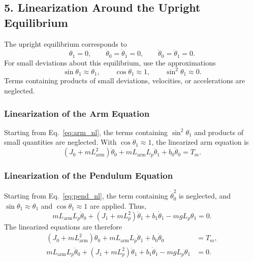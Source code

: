 \documentclass[a4paper,11pt]{article}
\newcommand{\La}{L_{\mathrm{arm}}}
\begin{document}
\subsection{5. Linearization Around the Upright Equilibrium}
The upright equilibrium corresponds to
\begin{equation}
  \theta_1 = 0, \qquad \dot\theta_0 = \dot\theta_1 = 0, \qquad \ddot\theta_0 = \ddot\theta_1 = 0 .
\end{equation}
For small deviations about this equilibrium, use the approximations
\begin{equation}
  \sin\theta_1 \approx \theta_1, \qquad \cos\theta_1 \approx 1, \qquad \sin^2\theta_1 \approx 0 .
\end{equation}
Terms containing products of small deviations, velocities, or accelerations are neglected.

\subsubsection{Linearization of the Arm Equation}
Starting from Eq.~\eqref{eq:arm_nl}, the terms containing $\sin^2\theta_1$ and products of small quantities are neglected. With $\cos\theta_1 \approx 1$, the linearized arm equation is
\begin{equation}
  \left(J_0 + m \La^2\right)\ddot\theta_0 + m \La L_p \ddot\theta_1 + b_0 \dot\theta_0 = T_m .
\end{equation}

\subsubsection{Linearization of the Pendulum Equation}
Starting from Eq.~\eqref{eq:pend_nl}, the term containing $\dot\theta_0^2$ is neglected, and $\sin\theta_1 \approx \theta_1$ and $\cos\theta_1 \approx 1$ are applied. Thus,
\begin{equation}
  m \La L_p \ddot\theta_0 + \left(J_1 + m L_p^2\right)\ddot\theta_1 + b_1 \dot\theta_1 - m g L_p \theta_1 = 0 .
\end{equation}
The linearized equations are therefore
\begin{equation}
\begin{aligned}
  \left(J_0 + m \La^2\right)\ddot\theta_0 + m \La L_p \ddot\theta_1 + b_0 \dot\theta_0 &= T_m ,\\
  m \La L_p \ddot\theta_0 + \left(J_1 + m L_p^2\right)\ddot\theta_1 + b_1 \dot\theta_1 - m g L_p \theta_1 &= 0 .
\end{aligned}
\label{eq:lin}
\end{equation}
\end{document}
